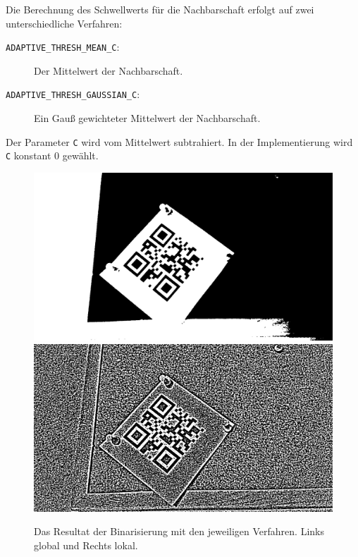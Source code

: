 Die Berechnung des Schwellwerts für die Nachbarschaft erfolgt auf zwei unterschiedliche Verfahren:
\begin{description}
	\item[\texttt{ADAPTIVE\_THRESH\_MEAN\_C}:] Der Mittelwert der Nachbarschaft.
	\item[\texttt{ADAPTIVE\_THRESH\_GAUSSIAN\_C}:] Ein Gauß gewichteter Mittelwert der Nachbarschaft.
\end{description}

Der Parameter \texttt{C} wird vom Mittelwert subtrahiert. In der Implementierung wird \texttt{C} konstant $0$ gewählt.

\begin{figure}[h]
\center
\includegraphics[scale=0.12]{images/qrcode-adler-wand_1___BINARIZED___.jpg}
\hspace{5px}
\includegraphics[scale=0.12]{images/qrcode-adler-wand_2___BINARIZED___.jpg}
\caption{Das Resultat der Binarisierung mit den jeweiligen Verfahren. Links global und Rechts lokal.}
\end{figure}